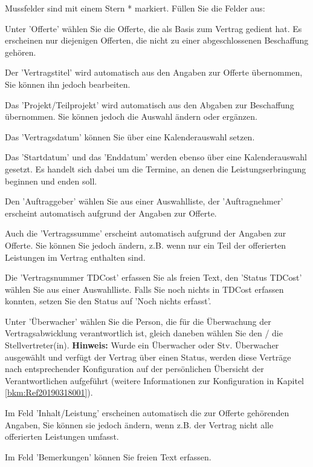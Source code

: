 Mussfelder sind mit einem Stern * markiert. Füllen Sie die Felder aus:

\vspace{\baselineskip}

\begin{compactitem}
\item {\sffamily\color{black}
Unter 'Offerte' wählen Sie die Offerte, die als Basis zum Vertrag gedient hat. Es erscheinen nur diejenigen Offerten, die nicht zu einer abgeschlossenen Beschaffung gehören.}
\item
Der 'Vertragstitel' wird automatisch aus den Angaben zur Offerte übernommen, Sie können ihn jedoch bearbeiten.
\item
Das 'Projekt/Teilprojekt' wird automatisch aus den Abgaben zur Beschaffung übernommen. Sie können jedoch die Auswahl ändern oder ergänzen.
\item
Das 'Vertragsdatum' können Sie über eine Kalenderauswahl setzen.
\item
Das 'Startdatum' und das 'Enddatum' werden ebenso über eine Kalenderauswahl gesetzt. Es handelt sich dabei um die Termine, an denen die Leistungserbringung beginnen und enden soll.
\item
Den 'Auftraggeber' wählen Sie aus einer Auswahlliste, der 'Auftragnehmer' erscheint automatisch aufgrund der Angaben zur Offerte.
\item
Auch die 'Vertragssumme' erscheint automatisch aufgrund der Angaben zur Offerte. Sie können Sie jedoch ändern, z.B. wenn nur ein Teil der offerierten Leistungen im Vertrag enthalten sind.
\item
Die 'Vertragsnummer TDCost' erfassen Sie als freien Text, den 'Status TDCost' wählen Sie aus einer Auswahlliste. Falls Sie noch nichts in TDCost erfassen konnten, setzen Sie den Status auf 'Noch nichts erfasst'.
\item
Unter 'Überwacher' wählen Sie die Person, die für die Überwachung der Vertragsabwicklung verantwortlich ist, gleich daneben wählen Sie den / die Stellvertreter(in). \textbf{Hinweis:} Wurde ein Überwacher oder Stv. Überwacher ausgewählt und verfügt der Vertrag über einen Status, werden diese Verträge nach entsprechender Konfiguration auf der persönlichen Übersicht der Verantwortlichen aufgeführt (weitere Informationen zur Konfiguration in Kapitel \ref{bkm:Ref20190318001}).
\item
Im Feld 'Inhalt/Leistung' erscheinen automatisch die zur Offerte gehörenden Angaben, Sie können sie jedoch ändern, wenn z.B. der Vertrag nicht alle offerierten Leistungen umfasst.
\item
Im Feld 'Bemerkungen' können Sie freien Text erfassen.
\end{compactitem}

